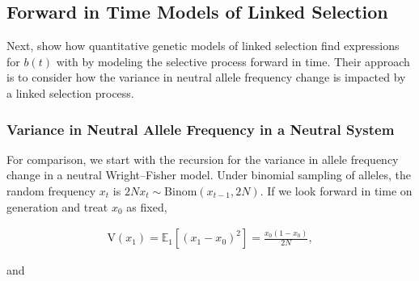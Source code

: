 \documentclass[11pt]{article}
\newcommand{\E}{\mathbb{E}}
\newcommand{\V}{\text{V}}
\begin{document}



\subsection*{Forward in Time Models of Linked Selection}

Next, show how quantitative genetic models of linked selection
\parencite{Robertson1961-ho,Santiago1995-hx,Santiago1998-bs,Santiago2016-mu}
find expressions for $b(t)$ with by modeling the selective process forward in
time. Their approach is to consider how the variance in neutral allele
frequency change is impacted by a linked selection process. 

\subsubsection*{Variance in Neutral Allele Frequency in a Neutral System}

For comparison, we start with the recursion for the variance in allele
frequency change in a neutral Wright--Fisher model. Under binomial sampling of
alleles, the random frequency $x_t$ is $2N x_t \sim \mathrm{Binom}(x_{t-1},
2N)$. If we look forward in time on generation and treat $x_0$ as fixed,

\begin{align}
  \V(x_1) = \E_1\left[(x_1 - x_0)^2\right]= \frac{x_0(1-x_0)}{2N},
\end{align}

and
\end{document}
